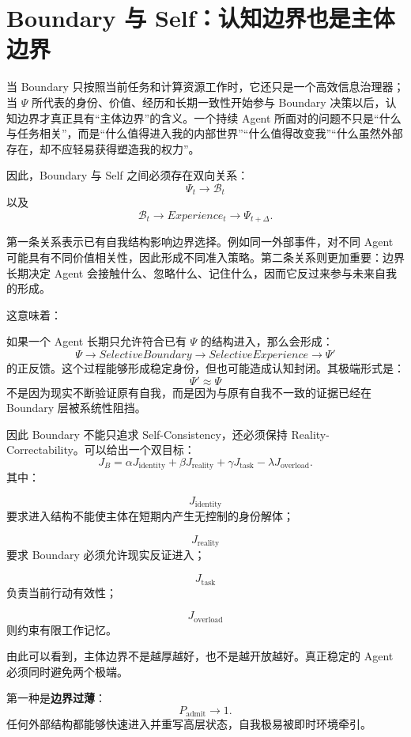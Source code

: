 \section{Boundary 与 Self：认知边界也是主体边界}

当 Boundary 只按照当前任务和计算资源工作时，它还只是一个高效信息治理器；当 $\Psi$ 所代表的身份、价值、经历和长期一致性开始参与 Boundary 决策以后，认知边界才真正具有“主体边界”的含义。一个持续 Agent 所面对的问题不只是“什么与任务相关”，而是“什么值得进入我的内部世界”“什么值得改变我”“什么虽然外部存在，却不应轻易获得塑造我的权力”。

因此，Boundary 与 Self 之间必须存在双向关系：
\[
\Psi_t
\longrightarrow
\mathcal{B}_t
\]
以及
\[
\mathcal{B}_t
\longrightarrow
Experience_t
\longrightarrow
\Psi_{t+\Delta}.
\]

第一条关系表示已有自我结构影响边界选择。例如同一外部事件，对不同 Agent 可能具有不同价值相关性，因此形成不同准入策略。第二条关系则更加重要：边界长期决定 Agent 会接触什么、忽略什么、记住什么，因而它反过来参与未来自我的形成。

这意味着：
\begin{statementbox}
\centering
{}
\end{statementbox}

如果一个 Agent 长期只允许符合已有 $\Psi$ 的结构进入，那么会形成：
\[
\Psi
\to
SelectiveBoundary
\to
SelectiveExperience
\to
\Psi'
\]
的正反馈。这个过程能够形成稳定身份，但也可能造成认知封闭。其极端形式是：
\[
\Psi'
\approx
\Psi
\]
不是因为现实不断验证原有自我，而是因为与原有自我不一致的证据已经在 Boundary 层被系统性阻挡。

因此 Boundary 不能只追求 Self-Consistency，还必须保持 Reality-Correctability。可以给出一个双目标：
\[
J_B
=
\alpha
J_{\mathrm{identity}}
+
\beta
J_{\mathrm{reality}}
+
\gamma
J_{\mathrm{task}}
-
\lambda
J_{\mathrm{overload}}.
\]
其中：

\[
J_{\mathrm{identity}}
\]
要求进入结构不能使主体在短期内产生无控制的身份解体；

\[
J_{\mathrm{reality}}
\]
要求 Boundary 必须允许现实反证进入；

\[
J_{\mathrm{task}}
\]
负责当前行动有效性；

\[
J_{\mathrm{overload}}
\]
则约束有限工作记忆。

由此可以看到，主体边界不是越厚越好，也不是越开放越好。真正稳定的 Agent 必须同时避免两个极端。

第一种是\textbf{边界过薄}：
\[
P_{\mathrm{admit}}\to1.
\]
任何外部结构都能够快速进入并重写高层状态，自我极易被即时环境牵引。

